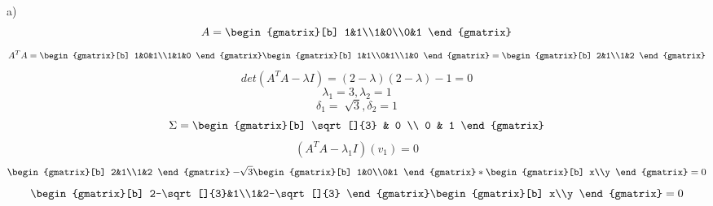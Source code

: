 \documentclass{article}
\begin{document}
a)
\begin{equation}
  A=
  \begin{gmatrix}[b]
    1&1\\1&0\\0&1
  \end{gmatrix}
\end{equation}
\begin{equation}
  A^TA=
  \begin{gmatrix}[b]
    1&0&1\\1&1&0
  \end{gmatrix}
  \begin{gmatrix}[b]
    1&1\\0&1\\1&0
  \end{gmatrix}
  =
  \begin{gmatrix}[b]
    2&1\\1&2
  \end{gmatrix}
\end{equation}
\begin{equation}
  det(A^TA-\lambda I)= (2- \lambda)(2-\lambda)-1 = 0
\end{equation}
\begin{equation}
  \lambda_1 = 3 ,\lambda_2 = 1
\end{equation}
\begin{equation}
  \delta_1 = \sqrt[]{3} , \delta_2 = 1
\end{equation}
\begin{equation}
  \Sigma = 
  \begin{gmatrix}[b]
    \sqrt[]{3} & 0 \\
    0 & 1
  \end{gmatrix}
\end{equation}
\begin{equation}
  (A^TA - \lambda_1 I)(v_1)=0
\end{equation}
\begin{equation}
  \begin{gmatrix}[b]
    2&1\\1&2
  \end{gmatrix}
  - \sqrt[]{3}
  \begin{gmatrix}[b]
    1&0\\0&1
  \end{gmatrix}
  *
  \begin{gmatrix}[b]
    x\\y
  \end{gmatrix}
  =0
\end{equation}
\begin{equation}
  \begin{gmatrix}[b]
    2-\sqrt[]{3}&1\\1&2-\sqrt[]{3}
  \end{gmatrix}
  \begin{gmatrix}[b]
    x\\y
  \end{gmatrix}
  =0
\end{equation}
\end{document}
